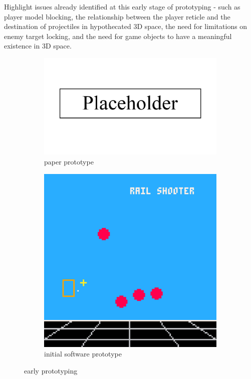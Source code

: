 \documentclass{article}
\begin{document}
Highlight issues already identified at this early stage of prototyping - such as
player model blocking, the relationship between the player reticle and the destination
of projectiles in hypothecated 3D space, the need for limitations on enemy
target locking, and the need for game objects to have a meaningful existence in 3D
space.

\begin{figure}[h]
\begin{subfigure}{.5\textwidth}
  \centering
  \includegraphics[width=.8\linewidth]{placeholder}
  \caption{paper prototype}
  \label{fig:pfig1}
\end{subfigure}
\begin{subfigure}{.5\textwidth}
  \centering
  \includegraphics[width=.8\linewidth]{prototype2d}
  \caption{initial software prototype}
  \label{fig:pfig2}
\end{subfigure}
\caption{early prototyping}
\label{fig:gameprototype}
\end{figure}
\end{document}
